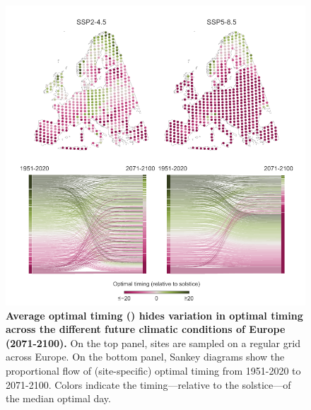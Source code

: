 \documentclass[11pt,letter]{article}
\begin{document}
\begin{figure}[h]
\centering
\includegraphics[scale = 1]{local_optimality_future.pdf}
\vspace*{-0.4cm}
\caption{\textbf{Average optimal timing () hides variation in optimal timing across the different future climatic conditions of Europe (2071-2100).} On the top panel, sites are sampled on a regular grid across Europe. On the bottom panel, Sankey diagrams show the proportional flow of (site-specific) optimal timing from 1951-2020 to 2071-2100. Colors indicate the timing—relative to the solstice—of the median optimal day.}
\label{fig:futurelocal}
\end{figure}

\clearpage

{\footnotesize
\vspace*{0cm}
}
\end{document}
